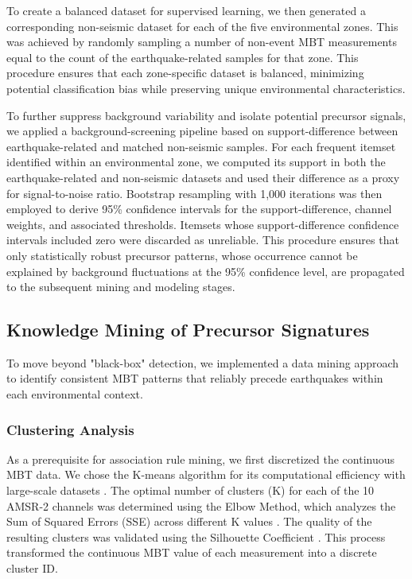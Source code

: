\documentclass[preprint,review,12pt,authoryear]{elsarticle}
\begin{document}
To create a balanced dataset for supervised learning, we then generated a corresponding non-seismic dataset for each of the five environmental zones. This was achieved by randomly sampling a number of non-event MBT measurements equal to the count of the earthquake-related samples for that zone. This procedure ensures that each zone-specific dataset is balanced, minimizing potential classification bias while preserving unique environmental characteristics.

To further suppress background variability and isolate potential precursor signals, we applied a background-screening pipeline based on support-difference between earthquake-related and matched non-seismic samples. For each frequent itemset identified within an environmental zone, we computed its support in both the earthquake-related and non-seismic datasets and used their difference as a proxy for signal-to-noise ratio. Bootstrap resampling with 1,000 iterations was then employed to derive 95\% confidence intervals for the support-difference, channel weights, and associated thresholds. Itemsets whose support-difference confidence intervals included zero were discarded as unreliable. This procedure ensures that only statistically robust precursor patterns, whose occurrence cannot be explained by background fluctuations at the 95\% confidence level, are propagated to the subsequent mining and modeling stages.

\subsection{Knowledge Mining of Precursor Signatures}\label{sec:knowledge_mining}
To move beyond "black-box" detection, we implemented a data mining approach to identify consistent MBT patterns that reliably precede earthquakes within each environmental context.

\subsubsection{Clustering Analysis}\label{sec:clustering}
As a prerequisite for association rule mining, we first discretized the continuous MBT data. We chose the K-means algorithm for its computational efficiency with large-scale datasets \citep{hanConceptsTechniques2006}. The optimal number of clusters (K) for each of the 10 AMSR-2 channels was determined using the Elbow Method, which analyzes the Sum of Squared Errors (SSE) across different K values \citep{thorndikeWhoBelongsFamily1953}. The quality of the resulting clusters was validated using the Silhouette Coefficient \citep{rousseeuwSilhouettesGraphicalAid1987}. This process transformed the continuous MBT value of each measurement into a discrete cluster ID.
\end{document}
